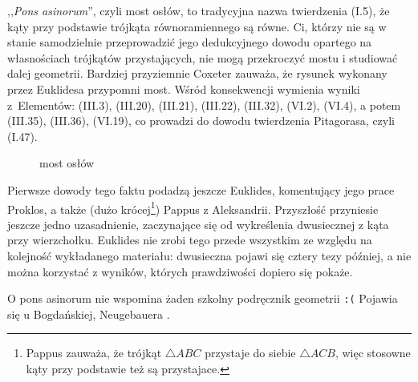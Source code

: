 %

,,\emph{Pons asinorum}'', czyli most osłów, to tradycyjna nazwa twierdzenia (I.5), że kąty przy podstawie trójkąta równoramiennego są równe.
Ci, którzy nie są w stanie samodzielnie przeprowadzić jego dedukcyjnego dowodu opartego na własnościach trójkątów przystających, nie mogą przekroczyć mostu i studiować dalej geometrii.
Bardziej przyziemnie Coxeter \cite[s. 22-24]{coxeter_1967} zauważa, że rysunek wykonany przez Euklidesa przypomni most.
Wśród konsekwencji wymienia wyniki z~Elementów: (III.3), (III.20), (III.21), (III.22), (III.32), (VI.2), (VI.4), a potem (III.35), (III.36), (VI.19), co prowadzi do dowodu twierdzenia Pitagorasa, czyli (I.47). %
%

\begin{figure}[H] \centering
\begin{comment}
\begin{tikzpicture}[scale=.5]
    \tkzDefPoint(90:-1){A}
    \tkzDefPoint(-55:5){C}
    \tkzDefPoint(235:5){B}
    \tkzDefPoint(-90:8){X}

    \tkzLabelPoint[above](A){$A$}
    \tkzLabelPoint[left](B){$B$}
    \tkzLabelPoint[right](C){$C$}
    \tkzInterLC(A,B)(A,X) \tkzGetPoints{XX}{D} %
    \tkzLabelPoint[left](D){$D$}
    \tkzDefLine[parallel=through D](B,C) \tkzGetPoint{XXX}
    \tkzInterLL(D,XXX)(A,C) \tkzGetPoint{E} %
    \tkzLabelPoint[right](E){$E$}
    
    \tkzMarkSegments[mark=|](A,B A,C)
    \tkzMarkSegments[mark=||](B,D C,E)
    \tkzDrawLines[add= 0 and 0, line width=0.2mm](B,E C,D)
    \tkzDrawLines[add= 0 and 0.5, line width=0.2mm](B,D C,E)
    \tkzDrawPolygon[line width=0.5mm](A,B,C)
    \tkzDrawPoints[size=4,color=black,fill=black!50](A,B,C,D,E)
\end{tikzpicture}
\end{comment}
    \caption{most osłów}
\end{figure}

Pierwsze dowody tego faktu podadzą jeszcze Euklides, komentujący jego prace Proklos, a także (dużo krócej\footnote{Pappus zauważa, że trójkąt $\triangle ABC$ przystaje do siebie $\triangle ACB$, więc stosowne kąty przy podstawie też są przystajace.}) Pappus z Aleksandrii.
%
%
Przyszłość przyniesie jeszcze jedno uzasadnienie, zaczynające się od wykreślenia dwusiecznej z kąta przy wierzchołku.
%
Euklides nie zrobi tego przede wszystkim ze względu na kolejność wykładanego materiału: dwusieczna pojawi się cztery tezy później, a nie można korzystać z wyników, których prawdziwości dopiero się pokaże.

O pons asinorum nie wspomina żaden szkolny podręcznik geometrii \texttt{:(}
Pojawia się u Bogdańskiej, Neugebauera \cite[s. 9]{neugebauer_2018}.


%